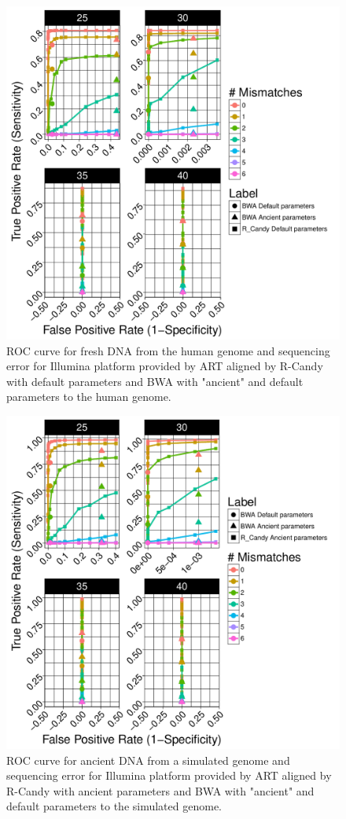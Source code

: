 \documentclass[11pt,a4paper]{report}
\begin{document}
\begin{figure}[H]
\centering
\includegraphics[width=12cm]{pictures/bROC_DS6_ART.pdf}
\caption{ROC curve for fresh DNA from the human genome and sequencing error 
for Illumina platform provided by ART aligned by 
R-Candy with default parameters and BWA with "ancient" and default parameters
to the human genome.}
\label{DS6_ART}
\end{figure}



\begin{figure}[H]
\centering
\includegraphics[width=12cm]{pictures/bROC_DS1_ART.pdf}
\caption{ROC curve for ancient DNA from a simulated genome and sequencing error 
for Illumina platform provided by ART aligned by 
R-Candy with ancient parameters and BWA with "ancient" and default parameters
to the simulated genome.}
\label{DS1_ART}
\end{figure}
\end{document}
